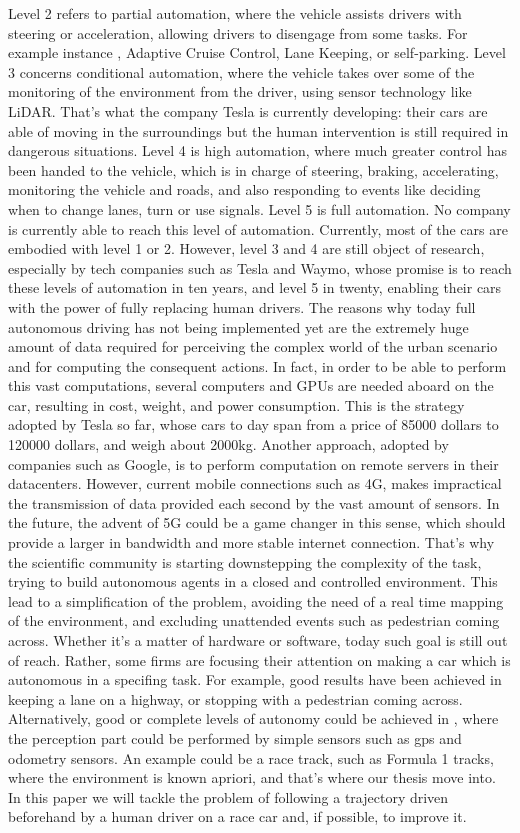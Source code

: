 Level 2 refers to partial automation, where the vehicle assists drivers with steering or acceleration, allowing drivers to disengage from some tasks.  For example instance , Adaptive Cruise Control, Lane Keeping, or self-parking.
Level 3 concerns conditional automation, where the vehicle takes over some of the monitoring of the environment from the driver, using sensor technology like LiDAR. That's what the company Tesla is currently developing: their cars are able of moving in the surroundings but the human intervention is still required in dangerous situations.
Level 4 is high automation, where much greater control has been handed to the vehicle, which is in charge of steering, braking, accelerating, monitoring the vehicle and roads, and also responding to events like deciding when to change lanes, turn or use signals.
Level 5 is full automation. No company is currently able to reach this level of automation.
Currently, most of the cars are embodied with level 1 or 2. However, level 3 and 4 are still object of research, especially by tech companies such as Tesla and Waymo, whose promise is to reach these levels of automation in ten years, and level 5 in twenty, enabling their cars with the power of fully replacing human drivers.
The reasons why today full autonomous driving has not being implemented yet are the extremely huge amount of data required for perceiving the complex world of the urban scenario and for computing the consequent actions. In fact, in order to be able to perform this vast computations, several computers and GPUs are needed aboard on the car, resulting in cost, weight, and power consumption. This is the strategy adopted by Tesla so far, whose cars to day span from a price of 85000 dollars to 120000 dollars, and weigh about 2000kg. 
Another approach, adopted by companies such as Google, is to perform computation on remote servers in their datacenters. However, current mobile connections such as 4G, makes impractical the transmission of data provided each second by the vast amount of sensors.
In the future, the advent of 5G could be a game changer in this sense, which should provide a larger in bandwidth and more stable internet connection.
That's why the scientific community is starting downstepping the complexity of the task, trying to build autonomous agents in a closed and controlled environment. This lead to a simplification of the problem, avoiding the need of a real time mapping of the environment, and excluding unattended events such as pedestrian coming across.
Whether it's a matter of hardware or software, today such goal is still out of reach. Rather, some firms are focusing their attention on making a car which is autonomous in a specifing task. For example, good results have been achieved in keeping a lane on a highway, or stopping with a pedestrian coming across. 
Alternatively, good or complete levels of autonomy could be achieved in , where the perception part could be performed by simple sensors such as gps and odometry sensors.
An example could be a race track, such as Formula 1 tracks, where the environment is known apriori, and that's where our thesis move into.
In this paper we will tackle the problem of following a trajectory driven beforehand by a human driver on a race car and, if possible, to improve it.

